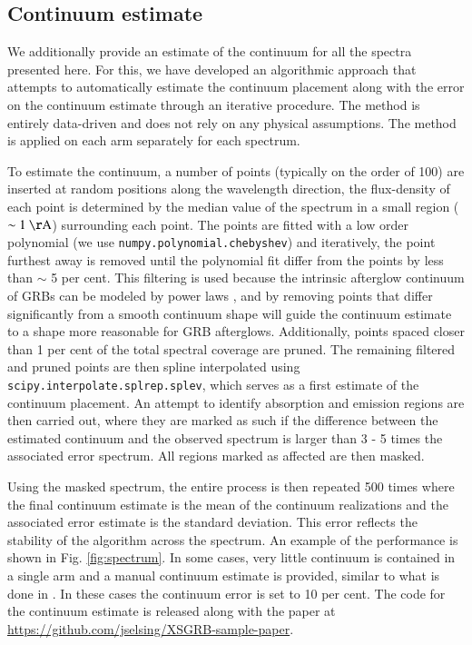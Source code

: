 \documentclass{aa}    %
\begin{document}
\subsection{Continuum estimate} \label{continuum}

We additionally provide an estimate of the continuum for all the spectra
presented here. For this, we have developed an algorithmic approach that
attempts to automatically estimate the continuum placement along with the error on
the continuum estimate through an iterative procedure. The method is entirely
data-driven and does not rely on any physical assumptions. The method is applied on
each arm separately for each spectrum.

To estimate the continuum, a number of points (typically on the order of 100)
are inserted at random positions along the wavelength direction, the
flux-density of each point is determined by the median value of the spectrum in
a small region ($\sim 1~\mathrm{\AA}$) surrounding each point. The points are
fitted with a low order polynomial (we use \texttt{numpy.polynomial.chebyshev})
and iteratively, the point furthest away is removed until the polynomial fit
differ from the points by less than $\sim$ 5 per cent. This filtering is used
because the intrinsic afterglow continuum of GRBs can be modeled by power laws
\citep{Piran2005}, and by removing points that differ significantly from a
smooth continuum shape will guide the continuum estimate to a shape more
reasonable for GRB afterglows. Additionally, points spaced closer than 1 per
cent of the total spectral coverage are pruned. The remaining filtered and
pruned points are then spline interpolated using
\texttt{scipy.interpolate.splrep.splev}, which serves as a first estimate of the
continuum placement. An attempt to identify absorption and emission regions are
then carried out, where they are marked as such if the difference between the
estimated continuum and the observed spectrum is larger than 3 - 5 times the
associated error spectrum. All regions marked as affected are then masked.

Using the masked spectrum, the entire process is then repeated 500 times where
the final continuum estimate is the mean of the continuum realizations and the
associated error estimate is the standard deviation. This error reflects the
stability of the algorithm across the spectrum. An example of the performance is
shown in Fig. \ref{fig:spectrum}. In some cases, very little continuum is
contained in a single arm and a manual continuum estimate is provided, similar
to what is done in \citet{Lopez2016}. In these cases the continuum error is set
to 10 per cent. The code for the continuum estimate is released along with the
paper at \url{https://github.com/jselsing/XSGRB-sample-paper}.
                                                                                           
\end{document}
